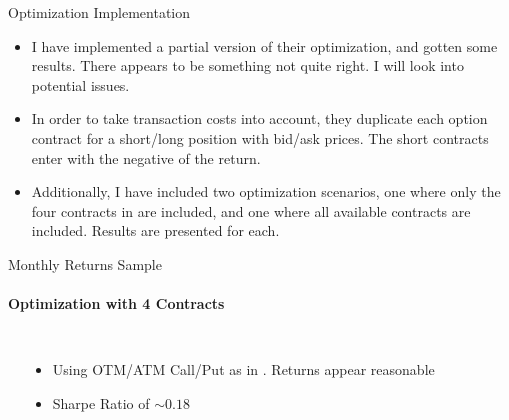 \documentclass[9pt]{beamer}
\begin{document}
\begin{frame}{Optimization Implementation}
\begin{itemize}
    \item I have implemented a partial version of their optimization, and gotten some results. There appears to be something not quite right. I will look into potential issues.
    \item In order to take transaction costs into account, they duplicate each option contract for a short/long position with bid/ask prices. The short contracts enter with the negative of the return.
    \item Additionally, I have included two optimization scenarios, one where only the four contracts in \citeauthor{faias2017optimal} are included, and one where all available contracts are included. Results are presented for each.
\end{itemize}
\end{frame}

\begin{frame}{Monthly Returns Sample}
\framesubtitle{Optimization with 4 Contracts}
\begin{columns}
    \begin{center}
    \scalebox{0.6}{}
    \end{center}
    \begin{itemize}
        \item Using OTM/ATM Call/Put as in \citeauthor{faias2017optimal}. Returns appear reasonable
        \item Sharpe Ratio of $\sim 0.18$
    \end{itemize}
\end{columns}
\end{frame}

\end{document}
